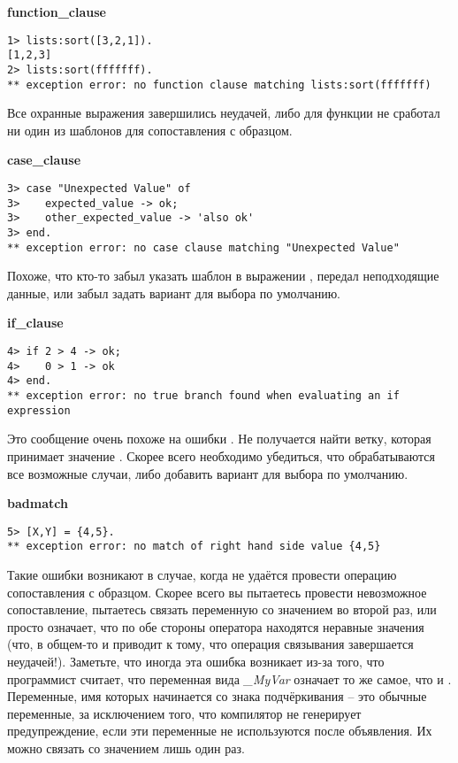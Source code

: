 \textbf{function\_clause}
\begin{lstlisting}[style=erlang]
1> lists:sort([3,2,1]).
[1,2,3]
2> lists:sort(fffffff).
** exception error: no function clause matching lists:sort(fffffff)
\end{lstlisting}

Все охранные выражения завершились неудачей, либо для функции не сработал ни один из шаблонов для сопоставления с образцом.
\blankline

\textbf{case\_clause}
\begin{lstlisting}[style=erlang]
3> case "Unexpected Value" of
3>    expected_value -> ok;
3>    other_expected_value -> 'also ok'
3> end.
** exception error: no case clause matching "Unexpected Value"
\end{lstlisting}

Похоже, что кто\--то забыл указать шаблон в выражении , передал неподходящие данные, или забыл задать вариант для выбора по умолчанию.
\blankline

\textbf{if\_clause}
\begin{lstlisting}[style=erlang]
4> if 2 > 4 -> ok;
4>    0 > 1 -> ok
4> end.
** exception error: no true branch found when evaluating an if expression
\end{lstlisting}

Это сообщение очень похоже на ошибки . Не получается найти ветку, которая принимает значение . Скорее всего необходимо убедиться, что обрабатываются все возможные случаи, либо добавить вариант  для выбора по умолчанию.
\blankline

\textbf{badmatch}
\begin{lstlisting}[style=erlang]
5> [X,Y] = {4,5}.
** exception error: no match of right hand side value {4,5}
\end{lstlisting}

Такие ошибки возникают в случае, когда не удаётся провести операцию сопоставления с образцом. Скорее всего вы пытаетесь провести невозможное сопоставление, пытаетесь связать переменную со значением во второй раз, или просто означает, что по обе стороны оператора \ops{\strut=} находятся неравные значения (что, в общем\--то и приводит к тому, что операция связывания завершается неудачей!). Заметьте, что иногда эта ошибка возникает из\--за того, что программист считает, что переменная вида \emph{\_MyVar} означает то же самое, что и \ops{\strut\_}. Переменные, имя которых начинается со знака подчёркивания \--- это обычные переменные, за исключением того, что компилятор не генерирует предупреждение, если эти переменные не используются после объявления. Их можно связать со значением лишь один раз.
\blankline

